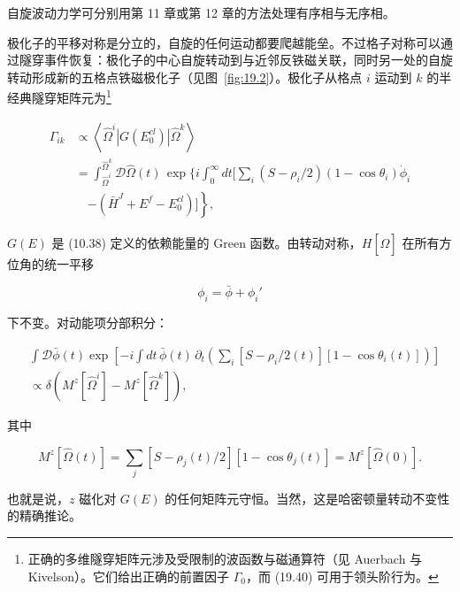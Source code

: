 自旋波动力学可分别用第 11 章或第 12 章的方法处理有序相与无序相。

极化子的平移对称是分立的，自旋的任何运动都要爬越能垒。不过格子对称可以通过隧穿事件恢复：极化子的中心自旋转动到与近邻反铁磁关联，同时另一处的自旋转动形成新的五格点铁磁极化子（见图~\ref{fig:19.2}）。极化子从格点 $i$ 运动到 $k$ 的半经典隧穿矩阵元为\footnote{正确的多维隧穿矩阵元涉及受限制的波函数与磁通算符（见 Auerbach 与 Kivelson）。它们给出正确的前置因子 $\Gamma_{0}$，而 (19.40) 可用于领头阶行为。}

\begin{align*}
\Gamma_{ik} & \propto \left\langle \hat {\Omega} ^ {i} \left| G \left( E _ {0} ^ {cl} \right) \right| \hat {\Omega} ^ {k} \right\rangle\\
& = \int_{\hat {\Omega} ^ {i}} ^ {\hat {\Omega} ^ {k}} \mathcal {D} \hat {\Omega} ( t ) \, \exp \Bigg\{ i \int_ {0} ^ {\infty} d t \Big[ \sum_ {i} \left( S - \rho_{i} /2 \right) \left( 1 - \cos \theta_ {i} \right) \dot {\phi} _ {i}\\
& \quad \left. - \left( \bar {H} ^ {J} + E ^ {f} - E _ {0} ^ {cl} \right) \Big] \right\} ,
\tag{19.40}
\end{align*}

$G(E)$ 是 (10.38) 定义的依赖能量的 Green 函数。由转动对称，$H[\hat{\Omega}]$ 在所有方位角的统一平移

\begin{equation*}
\phi _ {i} = \bar {\phi} + \phi _ {i} '
\tag{19.41}
\end{equation*}

下不变。对动能项分部积分：

\begin{align*}
& \int \mathcal {D} \bar {\phi} ( t ) \exp \left[ - i \int d t \, \bar {\phi} ( t ) \, \partial_ {t} \left( \sum_ {i} \left[ S - \rho_{i} /2 ( t ) \right] \left[ 1 - \cos \theta_ {i} ( t ) \right] \right) \right]\\
& \propto \delta \left( M ^ {z} [ \hat {\Omega} ^ {i} ] - M ^ {z} [ \hat {\Omega} ^ {k} ] \right) ,
\tag{19.42}
\end{align*}

其中

\begin{equation*}
M ^ {z} [ \hat {\Omega} ( t ) ] = \sum_ {j} \left[ S - \rho_{j} ( t ) /2 \right] \left[ 1 - \cos \theta_ {j} ( t ) \right] = M ^ {z} [ \hat {\Omega} ( 0 ) ].
\tag{19.43}
\end{equation*}

也就是说，$z$ 磁化对 $G(E)$ 的任何矩阵元守恒。当然，这是哈密顿量转动不变性的精确推论。

